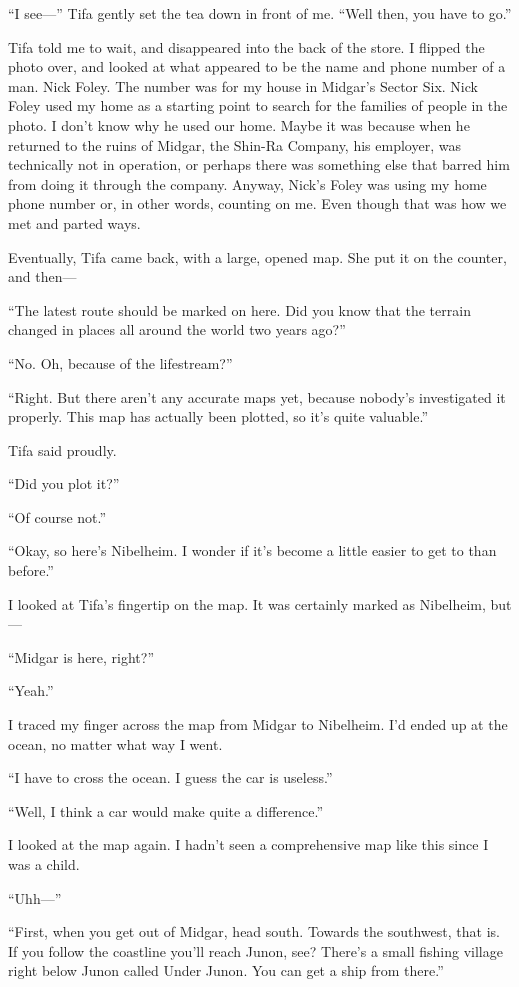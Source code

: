 \documentclass[oneside]{book}
\begin{document}
“I see—” Tifa gently set the tea down in front of me. “Well then, you have to go.”

Tifa told me to wait, and disappeared into the back of the store. I flipped the photo over, and looked at what appeared to be the name and phone number of a man. Nick Foley. The number was for my house in Midgar’s Sector Six. Nick Foley used my home as a starting point to search for the families of people in the photo. I don’t know why he used our home. Maybe it was because when he returned to the ruins of Midgar, the Shin-Ra Company, his employer, was technically not in operation, or perhaps there was something else that barred him from doing it through the company. Anyway, Nick’s Foley was using my home phone number or, in other words, counting on me. Even though that was how we met and parted ways.

Eventually, Tifa came back, with a large, opened map. She put it on the counter, and then—

“The latest route should be marked on here. Did you know that the terrain changed in places all around the world two years ago?”

“No. Oh, because of the lifestream?”

“Right. But there aren’t any accurate maps yet, because nobody’s investigated it properly. This map has actually been plotted, so it’s quite valuable.”

Tifa said proudly.

“Did you plot it?”

“Of course not.”

“Okay, so here’s Nibelheim. I wonder if it’s become a little easier to get to than before.”

I looked at Tifa’s fingertip on the map. It was certainly marked as Nibelheim, but—

“Midgar is here, right?”

“Yeah.”

I traced my finger across the map from Midgar to Nibelheim. I’d ended up at the ocean, no matter what way I went.

“I have to cross the ocean. I guess the car is useless.”

“Well, I think a car would make quite a difference.”

I looked at the map again. I hadn’t seen a comprehensive map like this since I was a child.

“Uhh—”

“First, when you get out of Midgar, head south. Towards the southwest, that is. If you follow the coastline you’ll reach Junon, see? There’s a small fishing village right below Junon called Under Junon. You can get a ship from there.”
\end{document}
